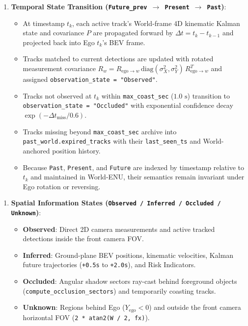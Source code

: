\documentclass[10.5pt,a4paper]{article}
\begin{document}
\begin{enumerate}[leftmargin=1.8em,itemsep=2pt]
\item \textbf{Temporal State Transition (\texttt{Future\_\allowbreak{}prev $\rightarrow$ Present $\rightarrow$ Past})}:
\begin{itemize}[leftmargin=1.5em,itemsep=2pt]
\item At timestamp $t_k$, each active track's World-frame 4D kinematic Kalman state and covariance $P$ are propagated forward by $\Delta t = t_k - t_{k-1}$ and projected back into Ego $t_k$'s BEV frame.
\item Tracks matched to current detections are updated with rotated measurement covariance $R_w = R_{\text{ego}\to w} \, \text{diag}(\sigma_X^2, \sigma_Y^2) \, R_{\text{ego}\to w}^T$ and assigned \texttt{observation\_\allowbreak{}state = "Observed"}.
\item Tracks not observed at $t_k$ within \texttt{max\_\allowbreak{}coast\_\allowbreak{}sec} ($1.0\text{ s}$) transition to \texttt{observation\_\allowbreak{}state = "Occluded"} with exponential confidence decay $\exp(-\Delta t_{\text{miss}} / 0.6)$.
\item Tracks missing beyond \texttt{max\_\allowbreak{}coast\_\allowbreak{}sec} archive into \texttt{past\_\allowbreak{}world.\allowbreak{}expired\_\allowbreak{}tracks} with their \texttt{last\_\allowbreak{}seen\_\allowbreak{}ts} and World-anchored position history.
\item Because \texttt{Past}, \texttt{Present}, and \texttt{Future} are indexed by timestamp relative to $t_k$ and maintained in World-ENU, their semantics remain invariant under Ego rotation or reversing.
\end{itemize}
\end{enumerate}

\begin{enumerate}[leftmargin=1.8em,itemsep=2pt]
\item \textbf{Spatial Information States (\texttt{Observed /\allowbreak{} Inferred /\allowbreak{} Occluded /\allowbreak{} Unknown})}:
\begin{itemize}[leftmargin=1.5em,itemsep=2pt]
\item \textbf{Observed}: Direct 2D camera measurements and active tracked detections inside the front camera FOV.
\item \textbf{Inferred}: Ground-plane BEV positions, kinematic velocities, Kalman future trajectories (\texttt{+0.\allowbreak{}5s} to \texttt{+2.\allowbreak{}0s}), and Risk Indicators.
\item \textbf{Occluded}: Angular shadow sectors ray-cast behind foreground objects (\texttt{compute\_\allowbreak{}occlusion\_\allowbreak{}sectors}) and temporarily coasting tracks.
\item \textbf{Unknown}: Regions behind Ego ($Y_{\text{ego}} < 0$) and outside the front camera horizontal FOV (\texttt{2 * atan2(W /\allowbreak{} 2,\allowbreak{} fx)}).
\end{itemize}
\end{enumerate}
\end{document}

